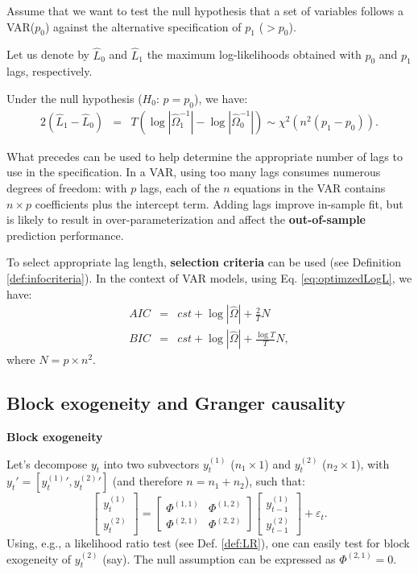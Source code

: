 \documentclass[
  12pt,
]{book}
\theoremstyle{definition}
\theoremstyle{definition}
\theoremstyle{definition}
\theoremstyle{definition}
\theoremstyle{remark}
\begin{document}
Assume that we want to test the null hypothesis that a set of variables follows a VAR(\(p_{0}\)) against the alternative
specification of \(p_{1}\) (\(>p_{0}\)).

Let us denote by \(\hat{L}_{0}\) and \(\hat{L}_{1}\) the maximum log-likelihoods obtained with \(p_{0}\) and \(p_{1}\) lags, respectively.

Under the null hypothesis (\(H_0\): \(p=p_0\)), we have:
\begin{eqnarray*}
2\left(\hat{L}_{1}-\hat{L}_{0}\right)&=&T\left(\log\left|\hat{\Omega}_{1}^{-1}\right|-\log\left|\hat{\Omega}_{0}^{-1}\right|\right)  \sim \chi^2(n^{2}(p_{1}-p_{0})).
\end{eqnarray*}

What precedes can be used to help determine the appropriate number of lags to use in the specification. In a VAR, using too many lags consumes numerous degrees of freedom: with \(p\) lags, each of the \(n\) equations in the VAR contains \(n\times p\) coefficients plus the intercept term. Adding lags improve in-sample fit, but is likely to result in over-parameterization and affect the \textbf{out-of-sample} prediction performance.

To select appropriate lag length, \textbf{selection criteria} can be used (see Definition \ref{def:infocriteria}). In the context of VAR models, using Eq. \eqref{eq:optimzedLogL}, we have:
\begin{eqnarray*}
AIC & = & cst + \log\left|\hat{\Omega}\right|+\frac{2}{T}N\\
BIC & = & cst + \log\left|\hat{\Omega}\right|+\frac{\log T}{T}N,
\end{eqnarray*}
where \(N=p \times n^{2}\).

\hypertarget{BlockGranger}{%
\subsection{Block exogeneity and Granger causality}\label{BlockGranger}}

\textbf{Block exogeneity}

Let's decompose \(y_t\) into two subvectors \(y^{(1)}_{t}\) (\(n_1 \times 1\)) and \(y^{(2)}_{t}\) (\(n_2 \times 1\)), with \(y_t' = [{y^{(1)}_{t}}',{y^{(2)}_{t}}']\) (and therefore \(n=n_1 +n_2\)), such that:
\[
\left[
\begin{array}{c}
y^{(1)}_{t}\\
y^{(2)}_{t}
\end{array}
\right] = \left[
\begin{array}{cc}
\Phi^{(1,1)} & \Phi^{(1,2)}\\
\Phi^{(2,1)} & \Phi^{(2,2)}
\end{array}
\right]
\left[
\begin{array}{c}
y^{(1)}_{t-1}\\
y^{(2)}_{t-1}
\end{array}
\right] + \varepsilon_t.
\]
Using, e.g., a likelihood ratio test (see Def. \ref{def:LR}), one can easily test for block exogeneity of \(y_t^{(2)}\) (say). The null assumption can be expressed as \(\Phi^{(2,1)}=0\).
\end{document}
